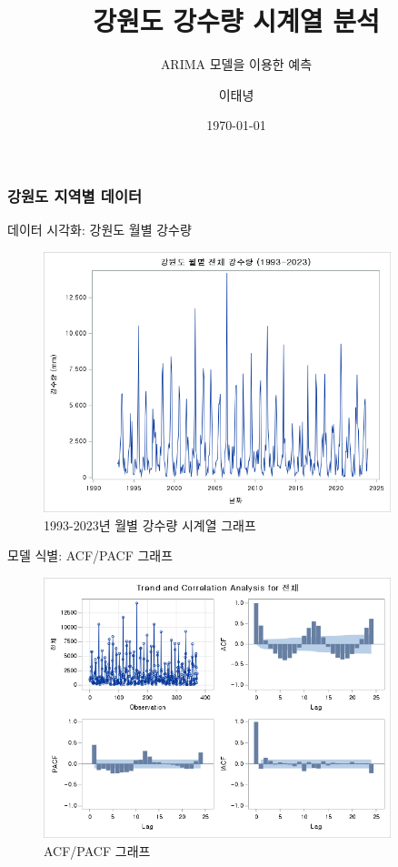 \documentclass{beamer}
\title{강원도 강수량 시계열 분석}
\subtitle{ARIMA 모델을 이용한 예측}
\author{이태녕}
\date{\today}
\begin{document}
\begin{frame}
    \titlepage
\end{frame}

\frametitle{강원도 지역별 데이터}

\begin{frame}{데이터 시각화: 강원도 월별 강수량}
    \begin{figure}
        \includegraphics[width=0.9\textwidth]{all_data.png}
        \caption{1993-2023년 월별 강수량 시계열 그래프}
    \end{figure}
\end{frame}


\begin{frame}{모델 식별: ACF/PACF 그래프}
    \begin{figure}
        \includegraphics[width=0.9\textwidth]{all_data_acf-pacf.png}
        \caption{ACF/PACF 그래프}
    \end{figure}
\end{frame}
\end{document}

